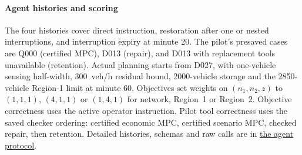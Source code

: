 \documentclass[preprint,12pt]{elsarticle}
\newcommand{\reproductiondetails}[1]{\href{https://github.com/AlienEslami/agentic-perimeter-runtime-certification/blob/main/paper/supporting_materials/REPRODUCING_THE_REDUCED_PAPER.md}{#1}}
\begin{document}
\paragraph{Agent histories and scoring}
\label{sec:supp-execution}
The four histories cover direct instruction, restoration after one or
nested interruptions, and interruption expiry at minute 20. The pilot's
presaved cases are Q000 (certified MPC), D013 (repair), and D013 with
replacement tools unavailable (retention). Actual planning starts from
D027, with one-vehicle sensing half-width, 300~veh/h residual bound,
2000-vehicle storage and the 2850-vehicle Region-1 limit at minute 60.
Objectives set weights on $(n_1,n_2,z)$ to $(1,1,1)$, $(4,1,1)$ or
$(1,4,1)$ for network, Region~1 or Region~2. Objective correctness uses
the active operator instruction. Pilot tool correctness uses the saved
checker ordering: certified economic MPC, certified scenario MPC,
checked repair, then retention. Detailed histories, schemas and raw
calls are in \reproductiondetails{the agent protocol}.


\setlength{\bibsep}{0pt}

\end{document}
